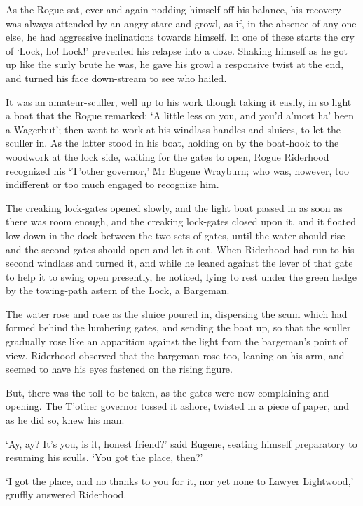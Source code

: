 As the Rogue sat, ever and again nodding himself off his balance, his
recovery was always attended by an angry stare and growl, as if, in the
absence of any one else, he had aggressive inclinations towards himself.
In one of these starts the cry of ‘Lock, ho! Lock!’ prevented his
relapse into a doze. Shaking himself as he got up like the surly brute
he was, he gave his growl a responsive twist at the end, and turned his
face down-stream to see who hailed.

It was an amateur-sculler, well up to his work though taking it easily,
in so light a boat that the Rogue remarked: ‘A little less on you, and
you’d a’most ha’ been a Wagerbut’; then went to work at his windlass
handles and sluices, to let the sculler in. As the latter stood in his
boat, holding on by the boat-hook to the woodwork at the lock side,
waiting for the gates to open, Rogue Riderhood recognized his ‘T’other
governor,’ Mr Eugene Wrayburn; who was, however, too indifferent or too
much engaged to recognize him.

The creaking lock-gates opened slowly, and the light boat passed in as
soon as there was room enough, and the creaking lock-gates closed upon
it, and it floated low down in the dock between the two sets of gates,
until the water should rise and the second gates should open and let it
out. When Riderhood had run to his second windlass and turned it, and
while he leaned against the lever of that gate to help it to swing
open presently, he noticed, lying to rest under the green hedge by the
towing-path astern of the Lock, a Bargeman.

The water rose and rose as the sluice poured in, dispersing the scum
which had formed behind the lumbering gates, and sending the boat up,
so that the sculler gradually rose like an apparition against the light
from the bargeman’s point of view. Riderhood observed that the bargeman
rose too, leaning on his arm, and seemed to have his eyes fastened on
the rising figure.

But, there was the toll to be taken, as the gates were now complaining
and opening. The T’other governor tossed it ashore, twisted in a piece
of paper, and as he did so, knew his man.

‘Ay, ay? It’s you, is it, honest friend?’ said Eugene, seating himself
preparatory to resuming his sculls. ‘You got the place, then?’

‘I got the place, and no thanks to you for it, nor yet none to Lawyer
Lightwood,’ gruffly answered Riderhood.

